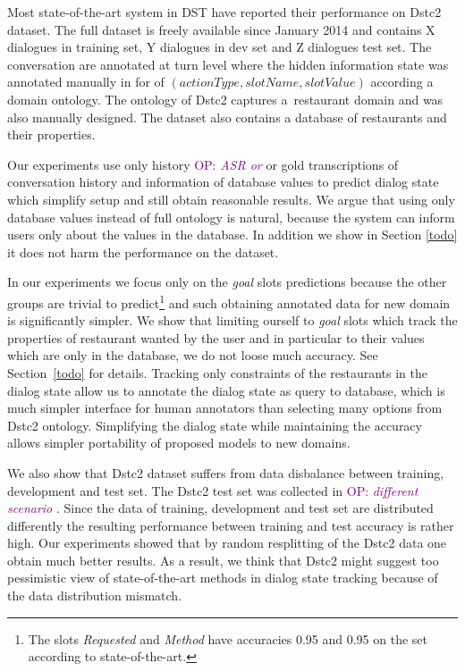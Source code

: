 \documentclass{itatnew}
\def\todo#1{\textcolor{purple}{OP: \textit{#1}}}
\begin{document}
Most state-of-the-art system in DST have reported their performance on Dstc2 dataset\cite{dstc2henderson}. 
The full dataset is freely available since January 2014 and contains X dialogues in training set, Y dialogues in dev set and Z dialogues test set.
The conversation are annotated at turn level where the hidden information state was annotated manually in for of $(actionType, slotName, slotValue)$
according a domain ontology.
The ontology of Dstc2 captures a~restaurant domain and was also manually designed.
The dataset also contains a database of restaurants and their properties.

Our experiments use only history \todo{ASR or } or gold transcriptions of conversation history and information of database values to predict dialog state which simplify setup and still obtain reasonable results.
We argue that using only database values instead of full ontology is natural, because the system can inform users only about the values in the database.
In addition we show in Section \ref{todo} it does not harm the performance on the dataset.

In our experiments we focus only on the {\it goal} slots predictions because the other groups are trivial to predict\footnote{The slots {\it Requested} and {\it Method} have accuracies 0.95 and 0.95 on the set according to state-of-the-art\cite{JWilliams}.} and such obtaining annotated data for new domain is significantly simpler.
We show that limiting ourself to {\it goal} slots which track the properties of restaurant wanted by the user  and in particular to their values which are only in the database, we do not loose much accuracy.
See Section~\ref{todo} for details.
Tracking only constraints of the restaurants in the dialog state allow us to annotate the dialog state as query to database, which is much simpler interface for human annotators than selecting many options from Dstc2 ontology.
Simplifying the dialog state while maintaining the accuracy allows simpler portability of proposed models to new domains.

We also show that Dstc2 dataset suffers from data disbalance between training, development and test set.
The Dstc2 test set was collected in \todo{different scenario} \cite{dstc2henderson}.
Since the data of training, development and test set are distributed differently the resulting performance between training and test accuracy is rather high. 
Our experiments showed that by random resplitting of the Dstc2 data one obtain much better results.
As a result, we think that Dstc2 might suggest too pessimistic view of state-of-the-art methods in dialog state tracking because of the data distribution mismatch.
\end{document}
